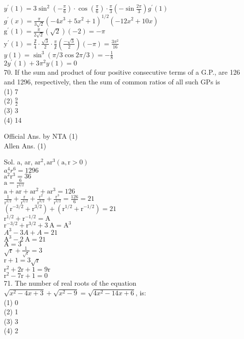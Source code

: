 \documentclass[10pt]{article}
\begin{document}
\(y^{\prime}(1)=3 \sin ^{2}\left(-\frac{\pi}{6}\right) \cdot \cos \left(\frac{\pi}{6}\right) \cdot \frac{\pi}{3}\left(-\sin \frac{2 \pi}{3}\right) g^{\prime}(1)\)\\
\(g^{\prime}(x)=\frac{\pi}{3 \sqrt{2}}\left(-4 x^{3}+5 x^{2}+1\right)^{1 / 2}\left(-12 x^{2}+10 x\right)\)\\
\(\mathrm{g}^{\prime}(1)=\frac{\pi}{2 \sqrt{2}}(\sqrt{2})(-2)=-\pi\)\\
\(\mathrm{y}^{\prime}(1)=\frac{\not 2}{4} \cdot \frac{\sqrt{3}}{2} \cdot \frac{\pi}{\not 2}\left(\frac{-\sqrt{3}}{2}\right)(-\pi)=\frac{3 \pi^{2}}{16}\)\\
\(y(1)=\sin ^{3}(\pi / 3 \cos 2 \pi / 3)=-\frac{1}{8}\)\\
\(2 y^{\prime}(1)+3 \pi^{2} y(1)=0\)\\
70. If the sum and product of four positive consecutive terms of a G.P., are 126 and 1296, respectively, then the sum of common ratios of all such GPs is\\
(1) 7\\
(2) \(\frac{9}{2}\)\\
(3) 3\\
(4) 14

Official Ans. by NTA (1)\\
Allen Ans. (1)

Sol. a, ar, \(\mathrm{ar}^{2}, \mathrm{ar}^{3}(\mathrm{a}, \mathrm{r}>0)\)\\
\(a^{4} r^{6}=1296\)\\
\(\mathrm{a}^{2} \mathrm{r}^{3}=36\)\\
\(\mathrm{a}=\frac{6}{\mathrm{r}^{3 / 2}}\)\\
\(\mathrm{a}+\mathrm{ar}+\mathrm{ar}^{2}+\mathrm{ar}^{3}=126\)\\
\(\frac{1}{\mathrm{r}^{3 / 2}}+\frac{\mathrm{r}}{\mathrm{r}^{3 / 2}}+\frac{\mathrm{r}^{2}}{\mathrm{r}^{3 / 2}}+\frac{\mathrm{r}^{3}}{\mathrm{r}^{3 / 2}}=\frac{126}{6}=21\)\\
\(\left(\mathrm{r}^{-3 / 2}+\mathrm{r}^{3 / 2}\right)+\left(\mathrm{r}^{1 / 2}+\mathrm{r}^{-1 / 2}\right)=21\)\\
\(\mathrm{r}^{1 / 2}+\mathrm{r}^{-1 / 2}=\mathrm{A}\)\\
\(\mathrm{r}^{-3 / 2}+\mathrm{r}^{3 / 2}+3 \mathrm{~A}=\mathrm{A}^{3}\)\\
\(A^{3}-3 A+A=21\)\\
\(\mathrm{A}^{3}-2 \mathrm{~A}=21\)\\
\(\mathrm{A}=3\)\\
\(\sqrt{\mathrm{r}}+\frac{1}{\sqrt{\mathrm{r}}}=3\)\\
\(\mathrm{r}+1=3 \sqrt{\mathrm{r}}\)\\
\(\mathrm{r}^{2}+2 \mathrm{r}+1=9 \mathrm{r}\)\\
\(\mathrm{r}^{2}-7 \mathrm{r}+1=0\)\\
71. The number of real roots of the equation \(\sqrt{x^{2}-4 x+3}+\sqrt{x^{2}-9}=\sqrt{4 x^{2}-14 x+6}\), is:\\
(1) 0\\
(2) 1\\
(3) 3\\
(4) 2
\end{document}
